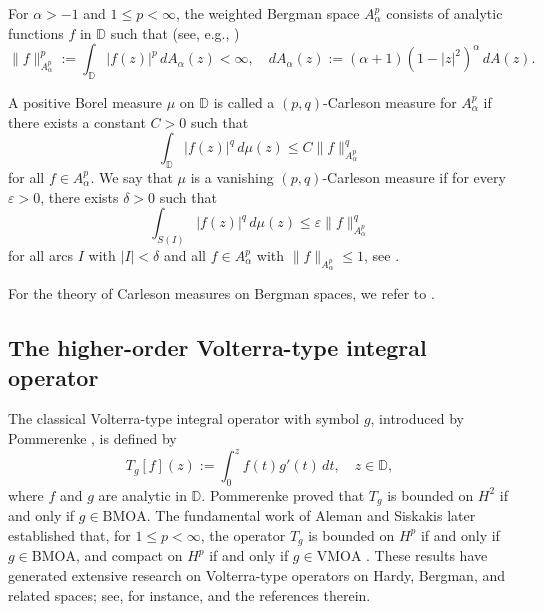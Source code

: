 \documentclass[preprint,12pt]{elsarticle}
\numberwithin{equation}{section}
\theoremstyle{remark}
\begin{document}
For $\alpha>-1$ and $1\le p<\infty$, the weighted Bergman space $A_\alpha^p$ consists of
analytic functions $f$ in $\mathbb D$ such that (see, e.g., \cite[p.~2]{Hedenmalm})
\begin{equation}\label{eq:bergman-norm}
\|f\|_{A_\alpha^p}^p:=\int_{\mathbb D}|f(z)|^p\,dA_\alpha(z)<\infty,
\quad
dA_\alpha(z):=(\alpha+1)(1-|z|^2)^\alpha\,dA(z).
\end{equation}


A positive Borel measure $\mu$ on $\mathbb{D}$ is called a $(p,q)$-Carleson measure
for $A_\alpha^p$ if there exists a constant $C > 0$ such that
\begin{equation*}
\int_{\mathbb{D}} |f(z)|^q \, d\mu(z) \le C \|f\|_{A_\alpha^p}^q
\end{equation*}
for all $f \in A_\alpha^p$. We say that $\mu$ is a vanishing $(p,q)$-Carleson measure
if for every $\varepsilon > 0$, there exists $\delta > 0$ such that
\begin{equation*}
\int_{S(I)} |f(z)|^q \, d\mu(z) \le \varepsilon \|f\|_{A_\alpha^p}^q
\end{equation*}
for all arcs $I$ with $|I| < \delta$ and all $f \in A_\alpha^p$ with $\|f\|_{A_\alpha^p} \le 1$, see \cite{oscar, Dya}.


For the theory of Carleson measures on Bergman spaces, we refer to
\cite{Hastings1975, Luecking1986, Zhu2007}.


\subsection{The higher-order Volterra-type integral operator} The classical Volterra-type integral operator with symbol $g$, introduced by Pommerenke \cite{Pommerenke1977}, is defined by \begin{equation*} T_g[f](z):=\int_0^z f(t)g'(t)\,dt,\quad z\in\mathbb{D}, \end{equation*} where $f$ and $g$ are analytic in $\mathbb{D}$. Pommerenke proved that $T_g$ is bounded on $H^2$ if and only if $g\in\mathrm{BMOA}$. The fundamental work of Aleman and Siskakis later established that, for $1\le p<\infty$, the operator $T_g$ is bounded on $H^p$ if and only if $g\in\mathrm{BMOA}$, and compact on $H^p$ if and only if $g\in\mathrm{VMOA}$ \cite{Aleman}. These results have generated extensive research on Volterra-type operators on Hardy, Bergman, and related spaces; see, for instance, \cite{Aleman-Cima-2001, AlemanSiskakis1997, Niko2020, Niko2024, zhou-zhu} and the references therein.
\end{document}
